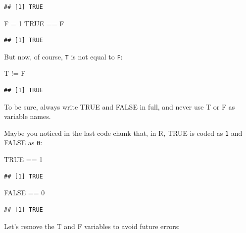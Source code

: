 \documentclass[
]{book}
\newenvironment{Shaded}{\begin{snugshade}}{\end{snugshade}}
\newcommand{\ConstantTok}[1]{\textcolor[rgb]{0.00,0.00,0.00}{#1}}
\newcommand{\DecValTok}[1]{\textcolor[rgb]{0.00,0.00,0.81}{#1}}
\newcommand{\NormalTok}[1]{#1}
\newcommand{\OtherTok}[1]{\textcolor[rgb]{0.56,0.35,0.01}{#1}}
\newcommand{\SpecialCharTok}[1]{\textcolor[rgb]{0.00,0.00,0.00}{#1}}
\begin{document}
\begin{verbatim}
## [1] TRUE
\end{verbatim}

\begin{Shaded}
\begin{Highlighting}[]
\NormalTok{F }\OtherTok{=} \DecValTok{1}
\ConstantTok{TRUE} \SpecialCharTok{==}\NormalTok{ F}
\end{Highlighting}
\end{Shaded}

\begin{verbatim}
## [1] TRUE
\end{verbatim}

But now, of course, \texttt{T} is not equal to \texttt{F}:

\begin{Shaded}
\begin{Highlighting}[]
\NormalTok{T }\SpecialCharTok{!=}\NormalTok{ F}
\end{Highlighting}
\end{Shaded}

\begin{verbatim}
## [1] TRUE
\end{verbatim}

To be sure, always write TRUE and FALSE in full, and never use T or F as variable names.

Maybe you noticed in the last code chunk that, in R, TRUE is coded as \texttt{1} and FALSE as \texttt{0}:

\begin{Shaded}
\begin{Highlighting}[]
\ConstantTok{TRUE} \SpecialCharTok{==} \DecValTok{1}
\end{Highlighting}
\end{Shaded}

\begin{verbatim}
## [1] TRUE
\end{verbatim}

\begin{Shaded}
\begin{Highlighting}[]
\ConstantTok{FALSE} \SpecialCharTok{==} \DecValTok{0}
\end{Highlighting}
\end{Shaded}

\begin{verbatim}
## [1] TRUE
\end{verbatim}

Let's remove the T and F variables to avoid future errors:
\end{document}
